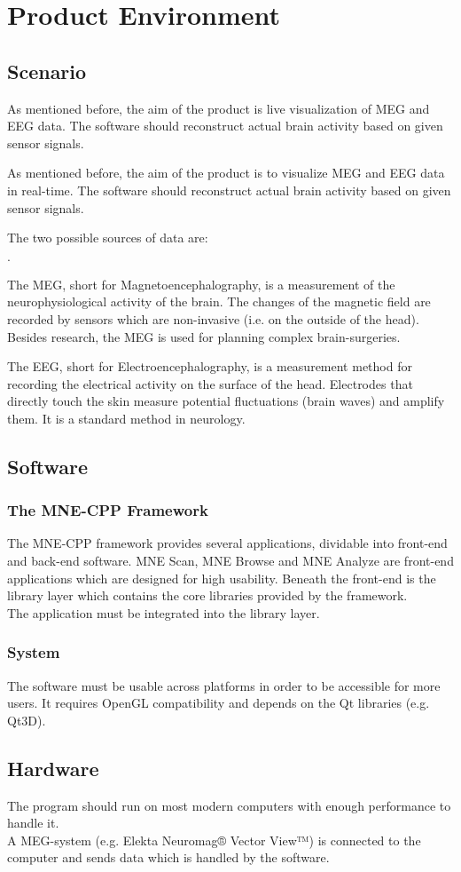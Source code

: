 \section {Product Environment}
\subsection{Scenario}

As mentioned before, the aim of the product is live visualization of MEG and EEG data. The software should reconstruct actual brain activity based on given sensor signals.

As mentioned before, the aim of the product is to visualize MEG and EEG data in real-time. The software should reconstruct actual brain activity based on given sensor signals.

The two possible sources of data are:
\begin{list}{$\cdot$}{}

\item The MEG, short for Magnetoencephalography, is a measurement of the neurophysiological activity of the brain. The changes of the magnetic field are recorded by sensors which are non-invasive (i.e. on the outside of the head). Besides research, the MEG is used for planning complex brain-surgeries.

\item The EEG, short for Electroencephalography, is a measurement method for recording the electrical activity on the surface of the head. Electrodes that directly touch the skin measure potential fluctuations (brain waves) and amplify them. It is a standard method in neurology.
\end{list}

\subsection{Software}
\subsubsection{The MNE-CPP Framework}The MNE-CPP framework provides several applications, dividable into front-end and back-end software. MNE Scan, MNE Browse and MNE Analyze are front-end applications which are designed for high usability.
Beneath the front-end is the library layer which contains the core libraries provided by the framework.\\
The application must be integrated into the library layer.
\subsubsection{System}
The software must be usable across platforms in order to be accessible for more users. It requires OpenGL compatibility and depends on the Qt libraries (e.g. Qt3D).
\subsection{Hardware}
The program should run on most modern computers with enough performance to handle it. \\
A MEG-system (e.g. Elekta Neuromag® Vector View™) is connected to the computer and sends data which is handled by the software.
